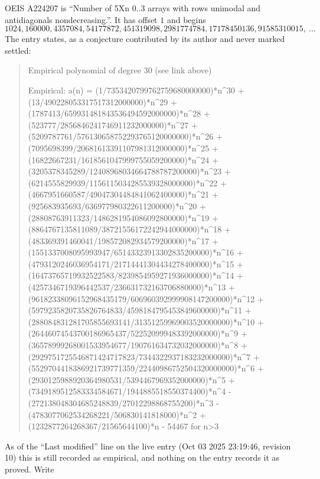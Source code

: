 \documentclass[11pt,a4paper]{article}
\theoremstyle{plain}
\theoremstyle{definition}
\begin{document}
OEIS A224207 is ``Number of 5Xn 0..3 arrays with rows unimodal and antidiagonals nondecreasing.''. It has offset $1$ and begins
\[
1024, 160000, 4357084, 54177872, 451319098, 2981774784, 17178450136, 91585310015,\ \dots
\]
The entry states, as a conjecture contributed by its author and never marked settled:
\begin{quote}
Empirical polynomial of degree 30 (see link above)

Empirical: a(n) = (1/7353420799762759680000000)*n\^{}30 + (13/490228053317517312000000)*n\^{}29 + (1787413/659931481843536494592000000)*n\^{}28 + (523777/2856846241746911232000000)*n\^{}27 + (5209787761/576130658752293765120000000)*n\^{}26 + (7095698399/20681613391107981312000000)*n\^{}25 + (16822667231/1618561047999755059200000)*n\^{}24 + (3205378345289/12408968034664788787200000)*n\^{}23 + (6214555829939/1156115034285539328000000)*n\^{}22 + (4667951660587/49047304484841062400000)*n\^{}21 + (925683935693/636977980322611200000)*n\^{}20 + (28808763911323/1486281954086092800000)*n\^{}19 + (8864767135811089/38721556172242944000000)*n\^{}18 + (483369391460041/198572082934579200000)*n\^{}17 + (1551337008095993947/65143323913302835200000)*n\^{}16 + (4793120246036954171/21714441304434278400000)*n\^{}15 + (16473765719932522583/8239854959271936000000)*n\^{}14 + (4257346719396442537/236631732163706880000)*n\^{}13 + (96182338096152968435179/606960392999908147200000)*n\^{}12 + (5979235820735826764833/4598184795453849600000)*n\^{}11 + (288084831281705855693141/31351259969003520000000)*n\^{}10 + (26446074543700186965437/522520999483392000000)*n\^{}9 + (36578999268001533954677/190761634732032000000)*n\^{}8 + (2929751725546871424717823/7344322937183232000000)*n\^{}7 + (5529704418386921739771359/22440986752504320000000)*n\^{}6 + (2930125988920364980531/5394467969352000000)*n\^{}5 + (7349189512583334584671/1944885518550374400)*n\^{}4 - (272138048304685248839/27012298868755200)*n\^{}3 - (4783077062534268221/506830141818000)*n\^{}2 + (1232877264268367/21565644100)*n - 54467 for n>3
\end{quote}
As of the ``Last modified'' line on the live entry (Oct 03 2025 23:19:46, revision 10) this is still
recorded as empirical, and nothing on the entry records it as proved. Write
\end{document}
